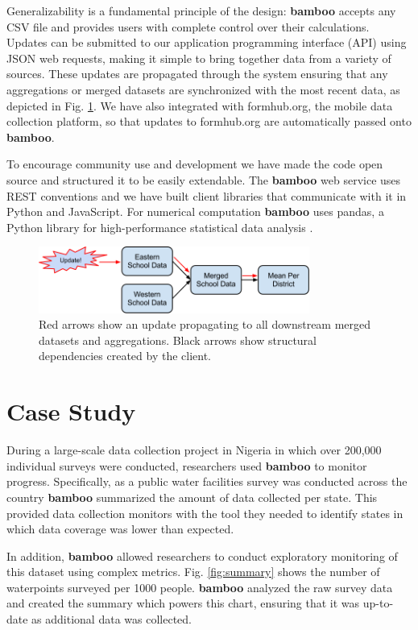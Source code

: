 \documentclass{sig-alternate}
\begin{document}
Generalizability is a fundamental principle of the design: \textbf{bamboo} accepts any
CSV file and provides users with complete control over their calculations.
Updates can be submitted to our application programming interface (API) using
JSON web requests, making it
simple to bring together data from a variety of sources.
These updates are propagated through the system ensuring that any aggregations
or merged datasets are synchronized with the most recent data, as depicted in Fig. \ref{fig:updates}.
We have also integrated with formhub.org, the mobile data collection platform,
so that updates to formhub.org are automatically passed onto \textbf{bamboo}.

To encourage community use and development we have made the code open source and
structured it to be easily extendable. The \textbf{bamboo} web service uses REST
conventions and we have built client libraries that communicate with it in
Python and JavaScript.  For numerical computation \textbf{bamboo} uses pandas, a
Python library for high-performance statistical data analysis \cite{mckinney}.

\begin{figure}
\centering
\includegraphics[width=3.5in]{figures/update_flow}
\caption{Red arrows show an update propagating to all downstream merged datasets and aggregations.  Black arrows show structural dependencies created by the client.}
\label{fig:updates}
\end{figure}

\section{Case Study}

During a large-scale data collection project in Nigeria in which over 200,000 individual
surveys were conducted, researchers used
\textbf{bamboo} to monitor progress.
Specifically, as a public water facilities survey was conducted across the country
\textbf{bamboo} summarized the amount of data collected per state.
This provided data collection monitors with the tool they needed to identify states in which data coverage was lower than expected.

In addition, \textbf{bamboo} allowed researchers to conduct exploratory monitoring of this
dataset using complex metrics.  Fig. \ref{fig:summary} shows the number of waterpoints surveyed per 1000
people.  \textbf{bamboo} analyzed the raw survey data and created the summary
which powers this chart, ensuring that it
was up-to-date as additional data was collected.
\end{document}
